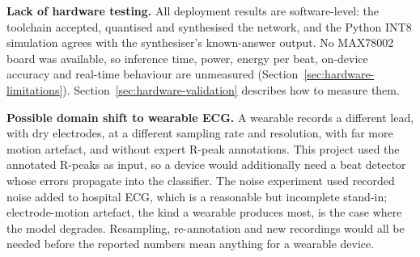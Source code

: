 \textbf{Lack of hardware testing.} All deployment results are software-level: the toolchain accepted, quantised and synthesised the network, and the Python INT8 simulation agrees with the synthesiser's known-answer output. No MAX78002 board was available, so inference time, power, energy per beat, on-device accuracy and real-time behaviour are unmeasured (Section~\ref{sec:hardware-limitations}). Section~\ref{sec:hardware-validation} describes how to measure them.

\textbf{Possible domain shift to wearable ECG.} A wearable records a different lead, with dry electrodes, at a different sampling rate and resolution, with far more motion artefact, and without expert R-peak annotations. This project used the annotated R-peaks as input, so a device would additionally need a beat detector whose errors propagate into the classifier. The noise experiment used recorded noise added to hospital ECG, which is a reasonable but incomplete stand-in; electrode-motion artefact, the kind a wearable produces most, is the case where the model degrades. Resampling, re-annotation and new recordings would all be needed before the reported numbers mean anything for a wearable device.
